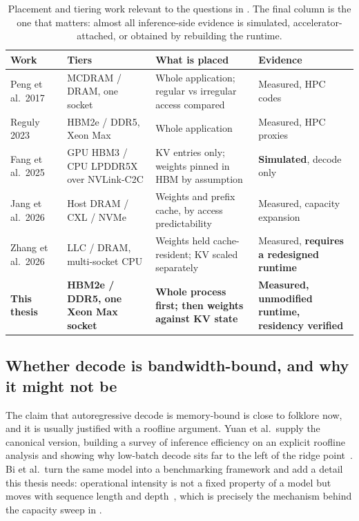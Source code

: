 \begin{table}[htbp]
\centering
\small
\tabsetup
\caption{Placement and tiering work relevant to the questions in .  The
final column is the one that matters: almost all inference-side evidence
is simulated, accelerator-attached, or obtained by rebuilding the
runtime.}
\label{tab:lit-tiering}
\begin{tabularx}{\textwidth}{@{}P{2.45cm}P{3.3cm}YP{2.7cm}@{}}
\toprule
\headrow
\textbf{Work} & \textbf{Tiers} & \textbf{What is placed} &
\textbf{Evidence} \\
\midrule
Peng et al.\ 2017~\cite{peng2017hybridmemory}
& MCDRAM / DRAM, one socket
& Whole application; regular vs irregular access compared
& Measured, HPC codes \\
\addlinespace[2pt]
Reguly 2023~\cite{reguly2023xeonmax}
& HBM2e / DDR5, Xeon Max
& Whole application
& Measured, HPC proxies \\
\addlinespace[2pt]
Fang et al.\ 2025~\cite{fang2025kvplacement}
& GPU HBM3 / CPU LPDDR5X over NVLink-C2C
& KV entries only; weights pinned in HBM by assumption
& \textbf{Simulated}, decode only \\
\addlinespace[2pt]
Jang et al.\ 2026~\cite{jang2026itme}
& Host DRAM / CXL / NVMe
& Weights and prefix cache, by access predictability
& Measured, capacity expansion \\
\addlinespace[2pt]
Zhang et al.\ 2026~\cite{zhang2026cacheresident}
& LLC / DRAM, multi-socket CPU
& Weights held cache-resident; KV scaled separately
& Measured, \textbf{requires a redesigned runtime} \\
\addlinespace[2pt]
\textbf{This thesis}
& \textbf{HBM2e / DDR5, one Xeon Max socket}
& \textbf{Whole process first; then weights against KV state}
& \textbf{Measured, unmodified runtime, residency verified} \\
\bottomrule
\end{tabularx}
\end{table}


\subsection{Whether decode is bandwidth-bound, and why it might not be}
\label{sec:lit-bandwidth}

The claim that autoregressive decode is memory-bound is close to folklore
now, and it is usually justified with a roofline argument.  Yuan et al.\
supply the canonical version, building a survey of inference efficiency
on an explicit roofline analysis and showing why low-batch decode sits
far to the left of the ridge point~\cite{yuan2024roofline}.  Bi et al.\
turn the same model into a benchmarking framework and add a detail this
thesis needs: operational intensity is not a fixed property of a model
but moves with sequence length and depth~\cite{bi2026rooflinebench},
which is precisely the mechanism behind the capacity sweep in
\secref{sec:working-set}.

